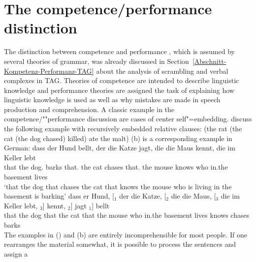 
\chapter{The competence/performance distinction}
\label{Abschnitt-Diskussion-Performanz}\label{chap-competence-performance}

The distinction\nocite{VL2006a} between competence and performance
\citep[Section~1.1]{Chomsky65a}, which is assumed by several theories of grammar, was already
discussed in Section~\ref{Abschnitt-Kompetenz-Performanz-TAG} about the analysis of scrambling and
verbal complexes in TAG. Theories of competence are
intended to describe linguistic knowledge and performance theories are assigned the task of
explaining how linguistic knowledge is used as well as why mistakes are made in speech production
and comprehension. A classic example in the competence/""performance discussion are cases of
center self"=embedding. \citet[]{CM63a} discuss the following example with
recursively embedded relative clauses: 
\ea
(the rat (the cat (the dog chased) killed) ate the malt)
\z
(b) is a corresponding example in German:
\eal
\ex 
\gll dass der Hund bellt, der die Katze jagt, die die Maus kennt, die im Keller lebt\\
     that the dog.\mas{} barks that.\mas{} the cat chases that.\fem{} the mouse knows who in.the basement lives\\
\glt `that the dog that chases the cat that knows the mouse who is living in the basement is barking'
\ex\label{Bsp-Selbsteinbettung} 
\gll dass er Hund, [$_1$ der die Katze, [$_2$ die die Maus, [$_3$ die im Keller lebt,  $_3$] kennt, $_2$] jagt $_1$] bellt\\
     that the dog {} that the cat {} that the mouse      {}    who in.the basement lives {} knows {} chases {} barks\\
\zl
%
The examples in () and (b) are entirely incomprehensible for most people.
If one rearranges the material somewhat, it is possible to process the sentences and assign a
